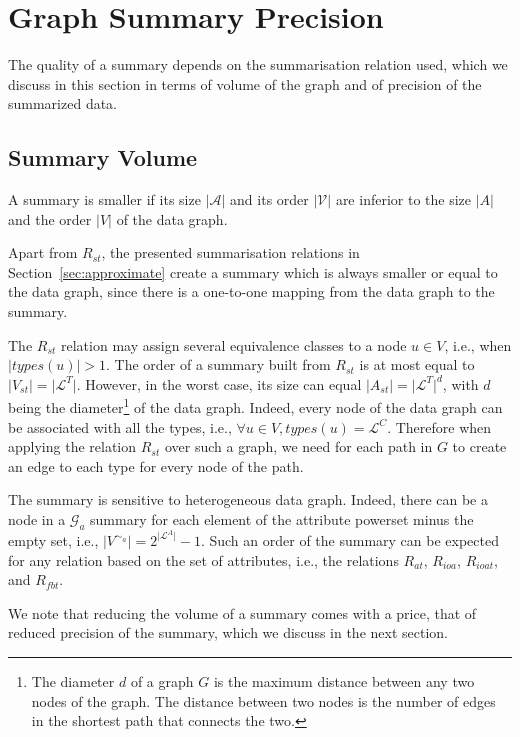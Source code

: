 \section{Graph Summary Precision}
\label{chap03:sec:quality}

The quality of a summary depends on the summarisation relation used, which we discuss in this section in terms of volume of the graph and of precision of the summarized data.

\subsection{Summary Volume}

A summary is smaller if its size $\vert \mathcal{A} \vert$ and its order $\vert \mathcal{V} \vert$ are inferior to the size $\vert A \vert$ and the order $\vert V \vert$ of the data graph.

Apart from $R_{st}$, the presented summarisation relations in Section~\ref{sec:approximate} create a summary which is always smaller or equal to the data graph, since there is a one-to-one mapping from the data graph to the summary.

The $R_{st}$ relation may assign several equivalence classes to a node $u \in V$, i.e., when $\vert types(u) \vert > 1$. The order of a summary built from $R_{st}$ is at most equal to $\vert V_{st} \vert = \vert \mathcal{L}^T \vert$. However, in the worst case, its size can equal $\vert A_{st} \vert = \vert \mathcal{L}^T \vert ^d$, with $d$ being the diameter\footnote{The diameter $d$ of a graph $G$ is the maximum distance between any two nodes of the graph. The distance between two nodes is the number of edges in the shortest path that connects the two.} of the data graph. Indeed, every node of the data graph can be associated with all the types, i.e., $\forall u \in V, types(u) = \mathcal{L}^C$. Therefore when applying the relation $R_{st}$ over such a graph, we need for each path in $G$ to create an edge to each type for every node of the path.

The summary is sensitive to heterogeneous data graph. Indeed, there can be a node in a $\mathcal{G}_a$ summary for each element of the attribute powerset minus the empty set, i.e., $\vert V^{\sim_a} \vert = 2^{\vert \mathcal{L}^A \vert} - 1$. Such an order of the summary can be expected for any relation based on the set of attributes, i.e., the relations $R_{at}$, $R_{ioa}$, $R_{ioat}$, and $R_{fbt}$.

We note that reducing the volume of a summary comes with a price, that of reduced precision of the summary, which we discuss in the next section.

